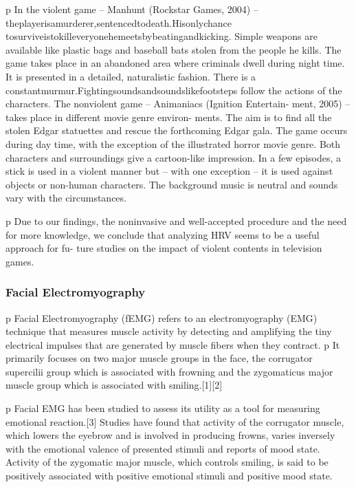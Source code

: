 p In the violent game – Manhunt (Rockstar Games, 2004) – theplayerisamurderer,sentencedtodeath.Hisonlychance tosurviveistokilleveryonehemeetsbybeatingandkicking. Simple weapons are available like plastic bags and baseball bats stolen from the people he kills. The game takes place in an abandoned area where criminals dwell during night time. It is presented in a detailed, naturalistic fashion. There is a constantmurmur.Fightingsoundsandsoundslikefootsteps follow the actions of the characters. The nonviolent game – Animaniacs (Ignition Entertain- ment, 2005) – takes place in different movie genre environ- ments. The aim is to find all the stolen Edgar statuettes and rescue the forthcoming Edgar gala. The game occurs during day time, with the exception of the illustrated horror movie genre. Both characters and surroundings give a cartoon-like impression. In a few episodes, a stick is used in a violent manner but – with one exception – it is used against objects or non-human characters. The background music is neutral and sounds vary with the circumstances.

p Due to our findings, the noninvasive and well-accepted procedure and the need for more knowledge, we conclude that analyzing HRV seems to be a useful approach for fu- ture studies on the impact of violent contents in television games.



\subsubsection{Facial Electromyography}

p Facial Electromyography (fEMG) refers to an electromyography (EMG) technique that measures muscle activity by detecting and amplifying the tiny electrical impulses that are generated by muscle fibers when they contract.
p It primarily focuses on two major muscle groups in the face, the corrugator supercilii group which is associated with frowning and the zygomaticus major muscle group which is associated with smiling.[1][2]

p Facial EMG has been studied to assess its utility as a tool for measuring emotional reaction.[3] Studies have found that activity of the corrugator muscle, which lowers the eyebrow and is involved in producing frowns, varies inversely with the emotional valence of presented stimuli and reports of mood state. Activity of the zygomatic major muscle, which controls smiling, is said to be positively associated with positive emotional stimuli and positive mood state.

